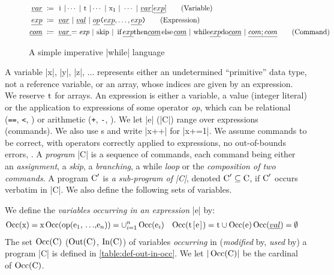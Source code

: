 \begin{figure}
\begin{align*}
\emph{var} \ \coloneqq{ } \ &
  \prc|i| \ | \cdots \ | \ \prc|t| %
  \ | \cdots \ | \ \prc|x$_1$| \ | \ \cdots \ | \ \emph{var}[\emph{exp}]
  \tag{Variable}
  \\
\emph{exp} \ \coloneqq{ } \ &
  \emph{var} \ |\ \emph{val} \ |\ \emph{op}\texttt{(}\emph{exp},
  \hdots,\emph{exp}\texttt{)} \tag{Expression}
  \\
\emph{com} \ \coloneqq{ } \ &
  \emph{var \;} \prc|=| \mathit{\; exp}\ |\  \prc|skip| \ | \ \prc|if| \emph{
  exp } \prc|then| \emph{ com } \prc|else| \emph{ com } \ | \ \prc|while| \emph{
  exp } \prc|do| \emph{ com} \ | \ \emph{com;com} \tag{Command}
\end{align*}
\caption{A simple imperative \prc|while| language}%
\label{fig:grammar}
\end{figure}

A variable \prc|x|, \prc|y|, \prc|z|, \(\hdots\) represents either
an undetermined \enquote{primitive} data type, \eg not a reference variable, or
an array, whose indices are given by an expression. We reserve $\prc|t|$ for
arrays. An expression is either a variable, a value (\eg integer literal) or the
application to expressions of some operator \emph{op}, which can be \eg
relational (\texttt{==},  \texttt{<}, \etc) or arithmetic  (\texttt{+},
\texttt{-}, \etc). We let \prc|e| (\resp \prc|C|) range over
expressions (\resp commands). We also use s
and write \eg \prc|x++| for \prc|x+=1|. We assume commands to be correct, \eg
with operators correctly applied to expressions, no out-of-bounds errors, \etc.
A \emph{program} \prc|C| is a sequence of commands, each command being
either an \emph{assignment}, a \emph{skip}, a \emph{branching}, a while
\emph{loop} or the \emph{composition of two commands}. A program
$\prc|C|'$ is \emph{a sub-program of \prc|C|}, denoted \(\prc|C|'
\subseteq \prc|C|\), if $\prc|C|'$ occurs verbatim in \prc|C|. We also define
the following sets of variables.

\begin{definition}%
\label{def:in-out-occ}
We define the \emph{variables occurring in an expression} \prc|e| by:
\[\begin{aligned}[t]
\Occ(\prc|x|) =\prc|x| &
\Occ(\prc|op(e$_1$, $\hdots$,e$_n$)|) = \cup_{i = 1}^n \Occ(\prc|e$_i$|) &
\Occ(\prc|t[e]|) =\prc|t| \cup \Occ(\prc|e|) &
\Occ(\emph{val}) =\emptyset
\end{aligned}\]
\noindent
The set \(\Occ(\prc|C|)\) (\resp $\Out(\prc|C|)$,
$\In(\prc|C|)$) of variables \emph{occurring}
in (\resp \emph{modified} by, \emph{used} by) a program \prc|C| is
defined in \autoref{table:def-out-in-occ}. We let $|\Occ(\prc|C|)|$ be the
cardinal of \(\Occ(\prc|C|)\).
\end{definition}


